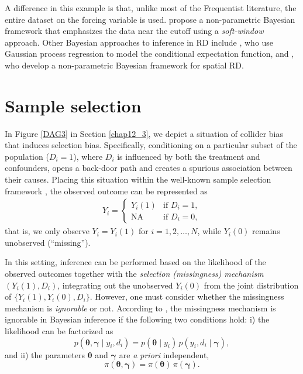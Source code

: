 A difference in this example is that, unlike most of the Frequentist literature, the entire dataset on the forcing variable is used. \cite{chib2023nonparametric} propose a non-parametric Bayesian framework that emphasizes the data near the cutoff using a \textit{soft-window} approach. Other Bayesian approaches to inference in RD include \cite{branson2019nonparametric}, who use Gaussian process regression to model the conditional expectation function, and \cite{rischard2020bayesian}, who develop a non-parametric Bayesian framework for spatial RD.

\section{Sample selection}\label{sec12_8}

In Figure \ref{DAG3} in Section \ref{chap12_3}, we depict a situation of collider bias that induces selection bias. Specifically, conditioning on a particular subset of the population ($D_i=1$), where $D_i$ is influenced by both the treatment and confounders, opens a back-door path and creates a spurious association between their causes. Placing this situation within the well-known sample selection framework \cite{heckman1979sample}, the observed outcome can be represented as
\begin{align*}
	Y_i = \begin{cases}
		Y_i(1) & \text{if } D_i=1, \\
		\text{NA} & \text{if } D_i=0,
	\end{cases}
\end{align*}
that is, we only observe $Y_i = Y_i(1)$ for $i=1,2,\dots,N$, while $Y_i(0)$ remains unobserved (``missing'').

In this setting, inference can be performed based on the likelihood of the observed outcomes together with the \textit{selection (missingness) mechanism} $(Y_i(1),D_i)$, integrating out the unobserved $Y_i(0)$ from the joint distribution of $\{Y_i(1),Y_i(0),D_i\}$. However, one must consider whether the missingness mechanism is \textit{ignorable} or not. According to \cite{little2019statistical}, the missingness mechanism is ignorable in Bayesian inference if the following two conditions hold:  
i) the likelihood can be factorized as
\[
p(\boldsymbol{\theta},\boldsymbol{\gamma}\mid y_i, d_i) 
= p(\boldsymbol{\theta}\mid y_i)\, p(y_i,d_i \mid \boldsymbol{\gamma}),
\] 
and  
ii) the parameters $\boldsymbol{\theta}$ and $\boldsymbol{\gamma}$ are \emph{a priori} independent,
\[
\pi(\boldsymbol{\theta},\boldsymbol{\gamma}) 
= \pi(\boldsymbol{\theta})\,\pi(\boldsymbol{\gamma}).
\]

